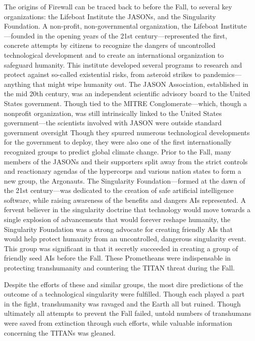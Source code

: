 The origins of Firewall can be traced back to before 
the Fall, to several key organizations: the Lifeboat Institute
the JASONs, and the Singularity Foundation.
A non-profit, non-governmental organization, the 
Lifeboat Institute—founded in the opening years 
of the 21st century—represented the first, concrete 
attempts by citizens to recognize the dangers of uncontrolled
technological development and to create
an international organization to safeguard humanity. 
This institute developed several programs to research 
and protect against so-called existential risks, from 
asteroid strikes to pandemics—anything that might 
wipe humanity out.
The JASON Association, established in the mid 
20th century, was an independent scientific advisory 
board to the United States government. Though tied 
to the MITRE Conglomerate—which, though a nonprofit
organization, was still intrinsically linked to
the United States government—the scientists involved 
with JASON were outside standard government oversight
Though they spurred numerous technological
developments for the government to deploy, they were 
also one of the first internationally recognized groups 
to predict global climate change. Prior to the Fall, 
many members of the JASONs and their supporters 
split away from the strict controls and reactionary 
agendas of the hypercorps and various nation states 
to form a new group, the Argonauts.
The Singularity Foundation—formed at the dawn of 
the 21st century—was dedicated to the creation of safe 
artificial intelligence software, while raising awareness 
of the benefits and dangers AIs represented. A fervent 
believer in the singularity doctrine that technology 
would move towards a single explosion of advancements
that would forever reshape humanity, the Singularity
Foundation was a strong advocate for creating
friendly AIs that would help protect humanity from an 
uncontrolled, dangerous singularity event. This group 
was significant in that it secretly succeeded in creating 
a group of friendly seed AIs before the Fall. These Prometheans
were indispensable in protecting transhumanity
and countering the TITAN threat during the Fall.

Despite the efforts of these and similar groups, the 
most dire predictions of the outcome of a technological
singularity were fulfilled. Though each played a
part in the fight, transhumanity was ravaged and the 
Earth all but ruined. Though ultimately all attempts 
to prevent the Fall failed, untold numbers of transhumans
were saved from extinction through such efforts,
while valuable information concerning the TITANs 
was gleaned.

